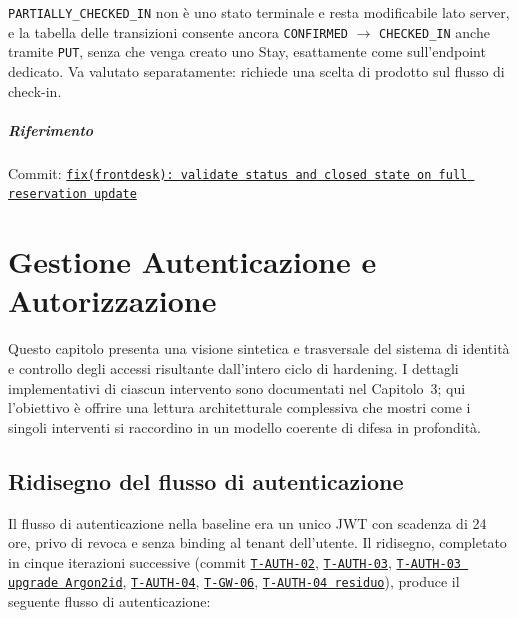 ﻿\documentclass[a4paper,12pt]{report}
\newcommand{\commitref}[2]{\texttt{\small \href{https://github.com/diegoandruccioli/hotel-pms/commit/#1}{#2}}}
\begin{document}
\begin{notebox}[title={Residuo noto}]
\texttt{PARTIALLY\_CHECKED\_IN} non è uno stato terminale e resta modificabile lato server, e la
tabella delle transizioni consente ancora \texttt{CONFIRMED} $\to$ \texttt{CHECKED\_IN} anche
tramite \texttt{PUT}, senza che venga creato uno Stay, esattamente come sull'endpoint dedicato.
Va valutato separatamente: richiede una scelta di prodotto sul flusso di check-in.
\end{notebox}

\paragraph{Riferimento} Commit: \commitref{1345919}{fix(frontdesk): validate status and closed state on full reservation update}

\chapter{Gestione Autenticazione e Autorizzazione}

Questo capitolo presenta una visione sintetica e trasversale del sistema
di identità e controllo degli accessi risultante dall'intero ciclo di hardening.
I dettagli implementativi di ciascun intervento sono documentati nel
Capitolo~3; qui l'obiettivo è offrire una lettura architetturale complessiva
che mostri come i singoli interventi si raccordino in un modello coerente
di difesa in profondità.

\section{Ridisegno del flusso di autenticazione}

Il flusso di autenticazione nella baseline era un unico JWT con scadenza di
24 ore, privo di revoca e senza binding al tenant dell'utente.
Il ridisegno, completato in cinque iterazioni successive (commit
\commitref{a90e462}{T-AUTH-02}, \commitref{4e1f1e9}{T-AUTH-03},
\commitref{446ad8d}{T-AUTH-03 upgrade Argon2id},
\commitref{5ce3010}{T-AUTH-04}, \commitref{b469e21}{T-GW-06},
\commitref{b473265}{T-AUTH-04 residuo}), produce il seguente flusso
di autenticazione:
\end{document}
